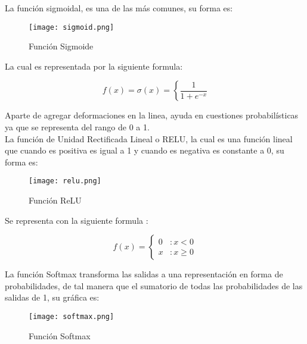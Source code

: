                 La funci\'on sigmoidal, es una de las m\'as comunes, su forma es: 

                \begin{figure}[H]
                    \centering
                    \texttt{[image: sigmoid.png]}
                    \caption{Funci\'on Sigmoide}
                    \label{fig:fig5}
                \end{figure}

                La cual es representada por la siguiente formula:

                \[f(x) = \sigma(x) =  \left\{ \frac{1}{1 + e^{-x}} \right. \]

                Aparte de agregar deformaciones en la linea, ayuda en 
                cuestiones probabil\'isticas ya que se representa del rango de 0 a 1. \\

                La funci\'on de Unidad Rectificada Lineal o RELU, la cual es una funci\'on lineal
                que cuando es positiva es igual a 1 y cuando es negativa es constante a 0, su forma es: \label{subsec: relu}

                \begin{figure}[H]
                    \centering
                    \texttt{[image: relu.png]}
                    \caption{Funci\'on ReLU}
                    \label{fig:fig6}
                \end{figure}

                Se representa con la siguiente formula \cite{Freire2021}: 

                \[f(x) = \left\{ \begin{array}{lr} 0 & : x < 0\\ x & : x \ge 0 \end{array} \right. \]

                La función Softmax transforma las salidas a una representación en forma de 
                probabilidades, de tal manera que el sumatorio de todas las probabilidades 
                de las salidas de 1, su gr\'afica es: \label{subsec: softmax}

                \begin{figure}[H]
                    \centering
                    \texttt{[image: softmax.png]}
                    \caption{Funci\'on Softmax}
                    \label{fig:fig7}
                \end{figure}

